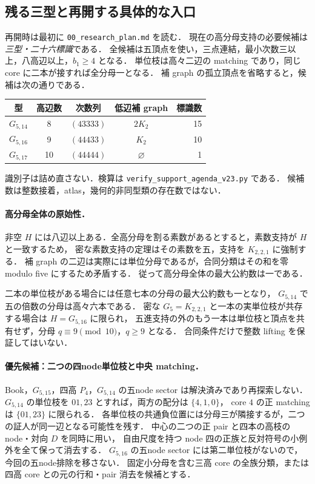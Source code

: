 \subsection{残る三型と再開する具体的な入口}
\label{ns25:support-agenda}\label{ns24:support-agenda}\label{ns23:support-agenda}\label{ns22:support-agenda}\label{ns20:support-agenda}

再開時は最初に \nolinkurl{00_research_plan.md} を読む．
現在の高分母支持の必要候補は\emph{三型・二十六標識}である．
全候補は五頂点を使い，三点連結，最小次数三以上，八高辺以上，$b_1\ge4$ となる．
単位枝は高々二辺の matching であり，同じ core に二本が接すれば全分母一となる．
補 graph の孤立頂点を省略すると，候補は次の通りである．
\begin{center}\small
\begin{tabular}{c|c|c|c|r}
型&高辺数&次数列&低辺補 graph&標識数\\\hline
$G_{5,14}$&8&$(43333)$&$2K_2$&15\\
$G_{5,16}$&9&$(44433)$&$K_2$&10\\
$G_{5,17}$&10&$(44444)$&$\varnothing$&1
\end{tabular}
\end{center}
識別子は詰め直さない．検算は \nolinkurl{verify_support_agenda_v23.py} である．
候補数は整数接着，atlas，幾何的非同型類の存在数ではない．

\paragraph{高分母全体の原始性．}
非空 $H$ には八辺以上ある．全高分母を割る素数があるとすると，素数支持が $H$ と一致するため，
密な素数支持の定理はその素数を五，支持を $K_{2,2,1}$ に強制する．
補 graph の二辺は実際には単位分母であるが，合同分類はその和を零 modulo five にするため矛盾する．
従って高分母全体の最大公約数は一である．

二本の単位枝がある場合には任意七本の分母の最大公約数も一となり，
$G_{5,14}$ で五の倍数の分母は高々六本である．
密な $G_5=K_{2,2,1}$ と一本の実単位枝が共存する場合は $H=G_{5,16}$ に限られ，
五進支持の外のもう一本は単位枝と頂点を共有せず，分母 $q\equiv9\pmod{10}$，$q\ge9$ となる．
合同条件だけで整数 lifting を保証してはいない．

\paragraph{優先候補：二つの四node単位枝と中央 matching．}
Book，$G_{5,15}$，四高 $P_4$，$G_{5,14}$ の五node sector は解決済みであり再探索しない．
$G_{5,14}$ の単位枝を $01,23$ とすれば，両方の配分は $\{4,1,0\}$，
core $4$ の正 matching は $\{01,23\}$ に限られる．
各単位枝の共通負位置には分母三が隣接するが，二つの証人が同一辺となる可能性を残す．
中心の二つの正 pair と四本の高枝の node・対向 $D$ を同時に用い，
自由尺度を持つ node 四の正族と反対符号の小例外を全て保って消去する．
$G_{5,16}$ の五node sector には第二単位枝がないので，今回の五node排除を移さない．
固定小分母を含む三高 core の全族分類，または四高 core との元の行和・pair 消去を候補とする．

